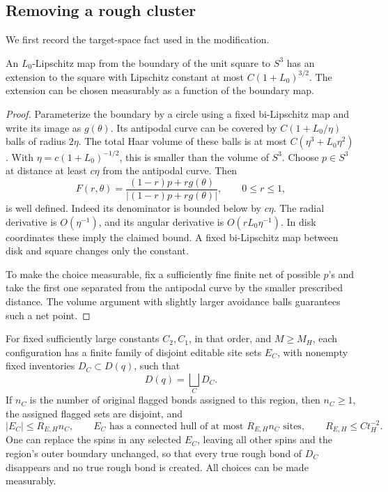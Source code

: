 \subsection{Removing a rough cluster}

We first record the target-space fact used in the modification.

\begin{lemma}
\label{cmp:filling}
An \(L_0\)-Lipschitz map from the boundary of the unit square to \(S^3\)
has an extension to the square with Lipschitz constant at most
\(C(1+L_0)^{3/2}\).  The extension can be chosen measurably as a function
of the boundary map.
\end{lemma}

\begin{proof}
Parameterize the boundary by a circle using a fixed bi-Lipschitz map
and write its image as \(g(\theta)\).  Its antipodal curve can be
covered by \(C(1+L_0/\eta)\) balls of radius \(2\eta\).  The total Haar
volume of these balls is at most
\(C(\eta^3+L_0\eta^2)\).  With
\(\eta=c(1+L_0)^{-1/2}\), this is smaller than the volume of \(S^3\).
Choose \(p\in S^3\) at distance at least \(c\eta\) from the antipodal
curve.  Then
\[
 F(r,\theta)=
 \frac{(1-r)p+rg(\theta)}{|(1-r)p+rg(\theta)|},
 \qquad 0\le r\le1,
\]
is well defined.  Indeed its denominator is bounded below by
\(c\eta\).  The radial derivative is \(O(\eta^{-1})\), and its angular
derivative is \(O(rL_0\eta^{-1})\).  In disk coordinates these imply the
claimed bound.  A fixed bi-Lipschitz map between disk and square changes
only the constant.

To make the choice measurable, fix a sufficiently fine finite net of
possible \(p\)'s and take the first one separated from the antipodal
curve by the smaller prescribed distance.  The volume argument with
slightly larger avoidance balls guarantees such a net point.
\end{proof}

\begin{lemma}
\label{cmp:editing}
For fixed sufficiently large constants \(C_2,C_1\), in that order,
and \(M\ge M_H\), each configuration has a finite family of disjoint
editable site sets \(E_C\), with nonempty fixed inventories
\(D_C\subset D(q)\), such that
\[
 D(q)=\bigsqcup_C D_C.
\]
If \(n_C\) is the number of original flagged bonds assigned to this
region, then \(n_C\ge1\), the assigned flagged sets are disjoint, and
\begin{equation}
 |E_C|\le R_{E,H}n_C,\qquad
 E_C\text{ has a connected hull of at most }R_{E,H}n_C\text{ sites},
 \qquad R_{E,H}\le Ct_H^{-2}.
 \label{cmp:edit-size}
\end{equation}
One can replace the spins in any selected \(E_C\), leaving all other
spins and the region's outer boundary unchanged, so that every true
rough bond of \(D_C\) disappears and no true rough bond is created.
All choices can be made measurably.
\end{lemma}

